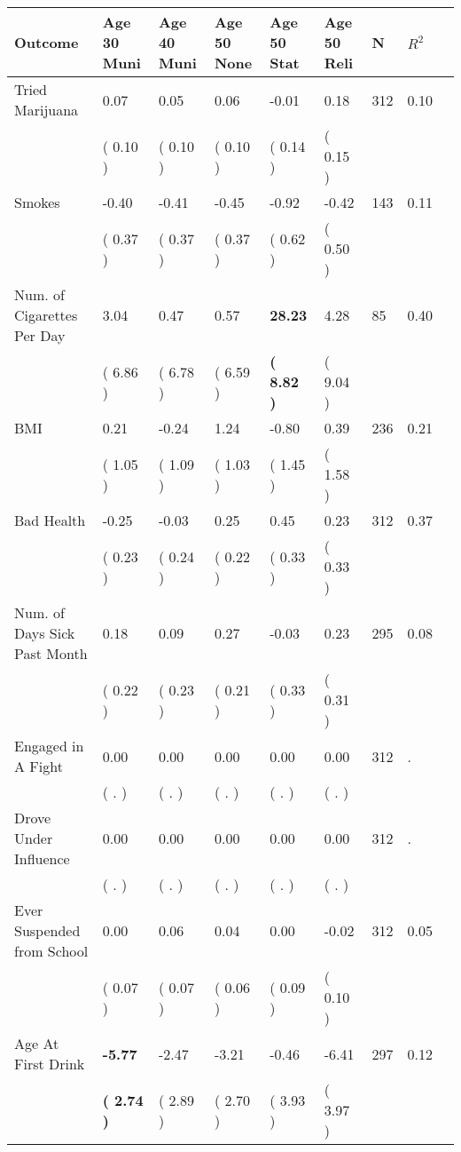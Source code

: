 \begin{tabular}{L{6.2cm} C{1.8cm} C{1.8cm} C{1.8cm} C{1.8cm} C{1.8cm} C{1.8cm} C{0.3cm} C{0.3cm}}
\toprule
 \textbf{Outcome} & \textbf{Age 30 Muni} & \textbf{Age 40 Muni} & \textbf{Age 50 None} & \textbf{Age 50 Stat} & \textbf{Age 50 Reli} & \textbf{N} & \textbf{$ R^2$} \\
\midrule
Tried Marijuana &      0.07 &      0.05 &      0.06 &     -0.01 &      0.18  & 312 &       0.10 \\ 
 & (     0.10 ) & (     0.10 ) & (     0.10 ) & (     0.14 ) & (     0.15 )  & \\
Smokes &     -0.40 &     -0.41 &     -0.45 &     -0.92 &     -0.42  & 143 &       0.11 \\ 
 & (     0.37 ) & (     0.37 ) & (     0.37 ) & (     0.62 ) & (     0.50 )  & \\
Num. of Cigarettes Per Day &      3.04 &      0.47 &      0.57 & \textbf{    28.23} &      4.28  & 85 &       0.40 \\ 
 & (     6.86 ) & (     6.78 ) & (     6.59 ) & \textbf{(     8.82 )} & (     9.04 )  & \\
BMI &      0.21 &     -0.24 &      1.24 &     -0.80 &      0.39  & 236 &       0.21 \\ 
 & (     1.05 ) & (     1.09 ) & (     1.03 ) & (     1.45 ) & (     1.58 )  & \\
Bad Health &     -0.25 &     -0.03 &      0.25 &      0.45 &      0.23  & 312 &       0.37 \\ 
 & (     0.23 ) & (     0.24 ) & (     0.22 ) & (     0.33 ) & (     0.33 )  & \\
Num. of Days Sick Past Month &      0.18 &      0.09 &      0.27 &     -0.03 &      0.23  & 295 &       0.08 \\ 
 & (     0.22 ) & (     0.23 ) & (     0.21 ) & (     0.33 ) & (     0.31 )  & \\
Engaged in A Fight &      0.00 &      0.00 &      0.00 &      0.00 &      0.00  & 312 &          . \\ 
 & (        . ) & (        . ) & (        . ) & (        . ) & (        . )  & \\
Drove Under Influence &      0.00 &      0.00 &      0.00 &      0.00 &      0.00  & 312 &          . \\ 
 & (        . ) & (        . ) & (        . ) & (        . ) & (        . )  & \\
Ever Suspended from School &      0.00 &      0.06 &      0.04 &      0.00 &     -0.02  & 312 &       0.05 \\ 
 & (     0.07 ) & (     0.07 ) & (     0.06 ) & (     0.09 ) & (     0.10 )  & \\
Age At First Drink & \textbf{    -5.77} &     -2.47 &     -3.21 &     -0.46 &     -6.41  & 297 &       0.12 \\ 
 & \textbf{(     2.74 )} & (     2.89 ) & (     2.70 ) & (     3.93 ) & (     3.97 )  & \\
\bottomrule
\end{tabular}
